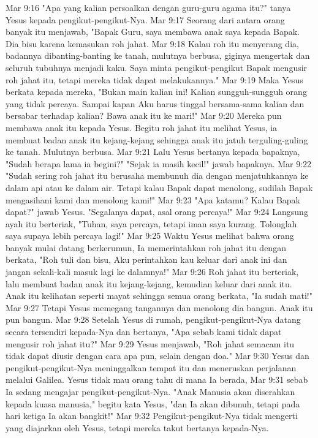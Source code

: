 Mar 9:16  "Apa yang kalian persoalkan dengan guru-guru agama itu?" tanya Yesus kepada pengikut-pengikut-Nya.
Mar 9:17  Seorang dari antara orang banyak itu menjawab, "Bapak Guru, saya membawa anak saya kepada Bapak. Dia bisu karena kemasukan roh jahat.
Mar 9:18  Kalau roh itu menyerang dia, badannya dibanting-banting ke tanah, mulutnya berbusa, giginya mengertak dan seluruh tubuhnya menjadi kaku. Saya minta pengikut-pengikut Bapak mengusir roh jahat itu, tetapi mereka tidak dapat melakukannya."
Mar 9:19  Maka Yesus berkata kepada mereka, "Bukan main kalian ini! Kalian sungguh-sungguh orang yang tidak percaya. Sampai kapan Aku harus tinggal bersama-sama kalian dan bersabar terhadap kalian? Bawa anak itu ke mari!"
Mar 9:20  Mereka pun membawa anak itu kepada Yesus. Begitu roh jahat itu melihat Yesus, ia membuat badan anak itu kejang-kejang sehingga anak itu jatuh terguling-guling ke tanah. Mulutnya berbusa.
Mar 9:21  Lalu Yesus bertanya kepada bapaknya, "Sudah berapa lama ia begini?" "Sejak ia masih kecil!" jawab bapaknya.
Mar 9:22  "Sudah sering roh jahat itu berusaha membunuh dia dengan menjatuhkannya ke dalam api atau ke dalam air. Tetapi kalau Bapak dapat menolong, sudilah Bapak mengasihani kami dan menolong kami!"
Mar 9:23  "Apa katamu? Kalau Bapak dapat?" jawab Yesus. "Segalanya dapat, asal orang percaya!"
Mar 9:24  Langsung ayah itu berteriak, "Tuhan, saya percaya, tetapi iman saya kurang. Tolonglah saya supaya lebih percaya lagi!"
Mar 9:25  Waktu Yesus melihat bahwa orang banyak mulai datang berkerumun, Ia memerintahkan roh jahat itu dengan berkata, "Roh tuli dan bisu, Aku perintahkan kau keluar dari anak ini dan jangan sekali-kali masuk lagi ke dalamnya!"
Mar 9:26  Roh jahat itu berteriak, lalu membuat badan anak itu kejang-kejang, kemudian keluar dari anak itu. Anak itu kelihatan seperti mayat sehingga semua orang berkata, "Ia sudah mati!"
Mar 9:27  Tetapi Yesus memegang tangannya dan menolong dia bangun. Anak itu pun bangun.
Mar 9:28  Setelah Yesus di rumah, pengikut-pengikut-Nya datang secara tersendiri kepada-Nya dan bertanya, "Apa sebab kami tidak dapat mengusir roh jahat itu?"
Mar 9:29  Yesus menjawab, "Roh jahat semacam itu tidak dapat diusir dengan cara apa pun, selain dengan doa."
Mar 9:30  Yesus dan pengikut-pengikut-Nya meninggalkan tempat itu dan meneruskan perjalanan melalui Galilea. Yesus tidak mau orang tahu di mana Ia berada,
Mar 9:31  sebab Ia sedang mengajar pengikut-pengikut-Nya. "Anak Manusia akan diserahkan kepada kuasa manusia," begitu kata Yesus, "dan Ia akan dibunuh, tetapi pada hari ketiga Ia akan bangkit!"
Mar 9:32  Pengikut-pengikut-Nya tidak mengerti yang diajarkan oleh Yesus, tetapi mereka takut bertanya kepada-Nya.

